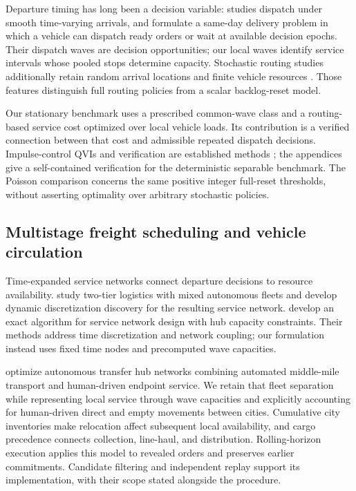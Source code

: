 Departure timing has long been a decision variable: \citet{Newell1971} studies dispatch under smooth time-varying arrivals, and \citet{Klapp2018} formulate a same-day delivery problem in which a vehicle can dispatch ready orders or wait at available decision epochs. Their dispatch waves are decision opportunities; our local waves identify service intervals whose pooled stops determine capacity. Stochastic routing studies additionally retain random arrival locations and finite vehicle resources \citep{Bertsimas1991,Bertsimas1993}. Those features distinguish full routing policies from a scalar backlog-reset model.

Our stationary benchmark uses a prescribed common-wave class and a routing-based service cost optimized over local vehicle loads. Its contribution is a verified connection between that cost and admissible repeated dispatch decisions. Impulse-control QVIs and verification are established methods \citep{LionsPerthame1986,Belak2017}; the appendices give a self-contained verification for the deterministic separable benchmark. The Poisson comparison concerns the same positive integer full-reset thresholds, without asserting optimality over arbitrary stochastic policies.

\subsection{Multistage freight scheduling and vehicle circulation}

Time-expanded service networks connect departure decisions to resource availability. \citet{Scherr2020} study two-tier logistics with mixed autonomous fleets and develop dynamic discretization discovery for the resulting service network. \citet{He2022} develop an exact algorithm for service network design with hub capacity constraints. Their methods address time discretization and network coupling; our formulation instead uses fixed time nodes and precomputed wave capacities.

\citet{Lee2024} optimize autonomous transfer hub networks combining automated middle-mile transport and human-driven endpoint service. We retain that fleet separation while representing local service through wave capacities and explicitly accounting for human-driven direct and empty movements between cities. Cumulative city inventories make relocation affect subsequent local availability, and cargo precedence connects collection, line-haul, and distribution. Rolling-horizon execution applies this model to revealed orders and preserves earlier commitments. Candidate filtering and independent replay support its implementation, with their scope stated alongside the procedure.
